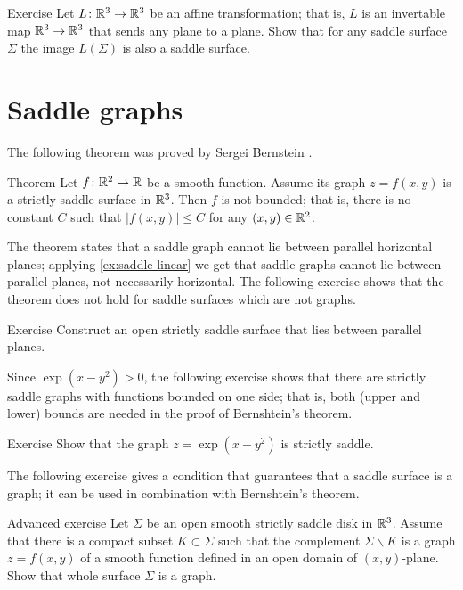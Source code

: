 \begin{thm}{Exercise}\label{ex:saddle-linear}
Let $L\colon\mathbb{R}^3\to\mathbb{R}^3$ be an affine transformation; that is, $L$ is an invertable map $\mathbb{R}^3\to\mathbb{R}^3$ that sends any plane to a plane. 
Show that for any saddle surface $\Sigma$ the image $L(\Sigma)$ is also a saddle surface.
\end{thm}


\section{Saddle graphs}

The following theorem was proved by Sergei Bernstein \cite{bernstein}.

\begin{thm}{Theorem}\label{thm:bernshtein}
Let $f\colon\mathbb{R}^2\to\mathbb{R}$ be a smooth function.
Assume its graph $z=f(x,y)$ is a strictly saddle surface in $\mathbb{R}^3$.
Then $f$ is not bounded;
that is, there is no constant $C$ such that 
$|f(x,y)|\le C$ for any $(x,y)\in\mathbb{R}^2$.
\end{thm}

The theorem states that a saddle graph cannot lie between parallel horizontal planes;
applying \ref{ex:saddle-linear} we get that saddle graphs cannot lie between parallel planes,
not necessarily horizontal.
The following exercise shows that the theorem does not hold for saddle surfaces which are not graphs.


\begin{thm}{Exercise}\label{ex:between-parallels}
Construct an open strictly saddle surface that lies between parallel planes.
\end{thm}

Since $\exp(x-y^2)>0$,
the following exercise shows that there are strictly saddle graphs with functions bounded on one side; that is, both (upper and lower) bounds are needed in the proof of Bernshtein's theorem.

\begin{thm}{Exercise}\label{ex:one-side-bernshtein}
Show that the graph
$z=\exp(x-y^2)$
is strictly saddle.
\end{thm}

The following exercise gives a condition that guarantees that a saddle surface is a graph;
it can be used in combination with Bernshtein's theorem.

\begin{thm}{Advanced exercise}\label{ex:saddle-graph}
Let $\Sigma$ be an open smooth strictly saddle disk in $\mathbb{R}^3$.
Assume that there is a compact subset $K\subset \Sigma$ such that the complement $\Sigma\backslash K$ is a graph $z=f(x,y)$ of a smooth function defined in an open domain of $(x,y)$-plane.
Show that whole surface $\Sigma$ is a graph.
\end{thm}

